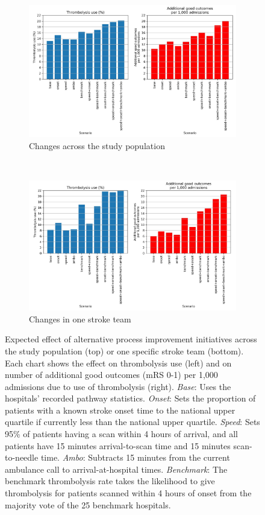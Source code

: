 \begin{figure}[!h]
    \centering
    \begin{subfigure}[b]{1\textwidth}
        \centering
        \includegraphics[width=0.8\linewidth]{images/sim_results_summary}
        \caption{Changes across the study population}
        \label{fig:scenarios_population}
    \end{subfigure}
    \\
    \vspace{8mm}
    \begin{subfigure}[b]{1\textwidth}
        \centering
    \includegraphics[width=0.8\linewidth]{images/sim_results_team_x}
        \caption{Changes in one stroke team}
        \label{fig:scenarios_team}
    \end{subfigure}
    \caption{Expected effect of alternative process improvement initiatives across the study population (top) or one specific stroke team (bottom). Each chart shows the effect on thrombolysis use (left) and on number of additional good outcomes (mRS 0-1) per 1,000 admissions due to use of thrombolysis (right). \textit{Base}: Uses the hospitals’ recorded pathway statistics. \textit{Onset}: Sets the proportion of patients with a known stroke onset time to the national upper quartile if currently less than the national upper quartile. \textit{Speed}: Sets 95\% of patients having a scan within 4 hours of arrival, and all patients have 15 minutes arrival-to-scan time and 15 minutes scan-to-needle time. \textit{Ambo}: Subtracts 15 minutes from the current ambulance call to arrival-at-hospital times. \textit{Benchmark}: The benchmark thrombolysis rate takes the likelihood to give thrombolysis for patients scanned within 4 hours of onset from the majority vote of the 25 benchmark hospitals.}
    \label{fig:sim_results_summary}
\end{figure}


